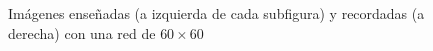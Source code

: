 \documentclass[11pt]{article} %
\begin{document}
\begin{figure}[h!]
\begin{minipage}{0.48\linewidth}
    \end{minipage}\hfill
    \begin{minipage}{0.48\linewidth}
        \centering
        \\
        \\
    \end{minipage}
\caption{\centering Imágenes enseñadas (a izquierda de cada subfigura) y recordadas (a derecha) con una red de $60 \times 60$}
    \label{fig:ej1_4}
\end{figure}
\end{document}

